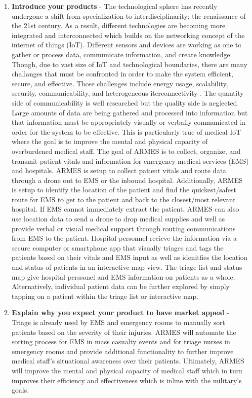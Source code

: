\documentclass[man]{article}
\begin{document}
\begin{enumerate}
\begin{enumerate}
          \item \textbf{Introduce your products} - The technological sphere has recently undergone a shift from specialization to interdisciplinarity; the renaissance of the 21st century. As a result, different technologies are becoming more integrated and interconnected which builds on the networking concept of the internet of things (IoT). Different sensors and devices are working as one to gather or process data, communicate information, and create knowledge. Though, due to vast size of IoT and technological boundaries, there are many challanges that must be confronted in order to make the system efficient, secure, and effective. Those challenges include energy usage, scalability, security, communicability, and heterogeneous iterconnectivity \cite{kranengurg}. The quantity side of communicability is well researched but the quality side is neglected. Large amounts of data are being gathered and processed into information but that information must be appropriately visually or verbally communicated in order for the system to be effective. This is particularly true of medical IoT where the goal is to improve the mental and physical capacity of overburdened medical staff. The goal of ARMES is to collect, organize, and transmit patient vitals and information for emergency medical services (EMS) and hospitals. ARMES is setup to collect patient vitals and route data through a drone out to EMS or the inbound hospital. Additionally, ARMES is setup to identify the location of the patient and find the quickest/safest route for EMS to get to the patient and back to the closest/most relevant hospital. If EMS cannot immediately extract the patient, ARMES can also use location data to send a drone to drop medical supplies and well as provide verbal or visual medical support through routing communications from EMS to the patient. Hospital personnel recieve the information via a secure computer or smartphone app that visually triages and tags the patients based on their vitals and EMS input as well as idenitfies the location and status of patients in an interactive map view. The triage list and status map give hospital perssonel and EMS information on patients as a whole. Alternatively, individual patient data can be further explored by simply tapping on a patient within the triage list or interactive map.
          \newpage

          \item \textbf{Explain why you expect your product to have market appeal} - Triage is already used by EMS and emergency rooms to manually sort patients based on the severity of their injuries. ARMES will automate the sorting process for EMS in mass casualty events and for triage nurses in emergency rooms and provide additional functionality to further improve medical staff's situational awareness over their patients. Ultimately, ARMES will improve the mental and physical capacity of medical staff which in turn improves their efficiency and effectiveness which is inline with the military's goals.
        \end{enumerate}


\end{enumerate}
\end{document}
